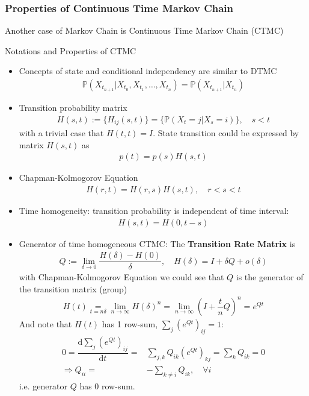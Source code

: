 \subsubsection{Properties of Continuous Time Markov Chain}\label{SubSubSectionCTMC}
Another case of Markov Chain is Continuous Time Markov Chain (CTMC)

\begin{point}
    Notations and Properties of CTMC
\end{point}
\begin{itemize}[topsep=2pt,itemsep=0pt]
    \item Concepts of state and conditional independency are similar to DTMC
    \begin{align}
         \mathbb{P}\left( X_{t_{n+1}}\big|X_{t_0},X_{t_1},\ldots,X_{t_{n}} \right)=\mathbb{P}\left( X_{t_{n+1}}\big| X_{t_n} \right)  
    \end{align}
    \item Transition probability matrix
    \begin{align}
         H(s,t):=\{H_{ij}(s,t)\}=\{\mathbb{P}\left( X_{t}=j|X_{s}=i \right) \},\quad s<t
    \end{align}
    with a trivial case that $ H(t,t)=I $. State transition could be expressed by matrix $ H(s,t) $ as
    \begin{align}
        p(t)=p(s)H(s,t)
    \end{align}
    
    \item Chapman-Kolmogorov Equation
    \begin{align}
        H(r,t)=H(r,s)H(s,t),\quad r<s<t 
    \end{align}
    \item Time homogeneity: transition probability is independent of time interval:
    \begin{align}
        H(s,t)=H(0,t-s) 
    \end{align}
    \item Generator of time homogeneous CTMC: The \textbf{Transition Rate Matrix} is 
    \begin{align}
        Q:=\lim_{\delta \to 0}\dfrac{H(\delta )-H(0)}{\delta },\quad H(\delta )=I+\delta Q+o(\delta ) 
    \end{align}
    with Chapman-Kolmogorov Equation we could see that $ Q $ is the generator of the transition matrix (group)
    \begin{align}
        H(t)\mathop{=}\limits_{t=n\delta }\lim_{n\to\infty}H(\delta )^n=\lim_{n\to\infty}\left(I+\dfrac{t}{n}Q\right)^{n}=e^{Qt}  
    \end{align}
    And note that $ H(t) $ has 1 row-sum, $ \sum_{j}\left(e^{Qt}\right)_{ij}=1 $:
    \begin{align}
        0=\dfrac{\mathrm{d}\sum_{j}\left(e^{Qt}\right)_{ij}}{\mathrm{d}t^{}}=&\sum_{j,k}Q_{ik} \left(e^{Qt}\right)_{kj}=\sum_{k}Q_{ik}=0\\
        \Rightarrow Q_{ii}=&-\sum_{k\neq i}Q_{ik},\quad \forall i
    \end{align}
    i.e. generator $ Q $ has 0 row-sum.


\end{itemize}
